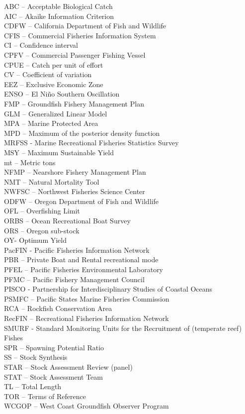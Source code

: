\documentclass[11pt,
  letterpaper,
]{article}
\begin{document}
ABC -- Acceptable Biological Catch\\
AIC -- Akaike Information Criterion\\
CDFW -- California Department of Fish and Wildlife\\
CFIS -- Commercial Fisheries Information System\\
CI -- Confidence interval\\
CPFV -- Commercial Passenger Fishing Vessel\\
CPUE -- Catch per unit of effort\\
CV -- Coefficient of variation\\
EEZ -- Exclusive Economic Zone\\
ENSO -- El Niño Southern Oscillation\\
FMP -- Groundfish Fishery Management Plan\\
GLM -- Generalized Linear Model\\
MPA -- Marine Protected Area\\
MPD -- Maximum of the posterior density function\\
MRFSS - Marine Recreational Fisheries Statistics Survey\\
MSY -- Maximum Sustainable Yield\\
mt -- Metric tons\\
NFMP -- Nearshore Fishery Management Plan\\
NMT -- Natural Mortality Tool\\
NWFSC -- Northwest Fisheries Science Center\\
ODFW -- Oregon Department of Fish and Wildlife\\
OFL -- Overfishing Limit\\
ORBS -- Ocean Recreational Boat Survey\\
ORS -- Oregon sub-stock\\
OY- Optimum Yield\\
PacFIN - Pacific Fisheries Information Network\\
PBR -- Private Boat and Rental recreational mode\\
PFEL -- Pacific Fisheries Environmental Laboratory\\
PFMC -- Pacific Fishery Management Council\\
PISCO - Partnership for Interdisciplinary Studies of Coastal Oceans\\
PSMFC -- Pacific States Marine Fisheries Commission\\
RCA -- Rockfish Conservation Area\\
RecFIN -- Recreational Fisheries Information Network\\
SMURF - Standard Monitoring Units for the Recruitment of (temperate reef) Fishes\\
SPR -- Spawning Potential Ratio\\
SS -- Stock Synthesis\\
STAR -- Stock Assessment Review (panel)\\
STAT -- Stock Assessment Team\\
TL -- Total Length\\
TOR -- Terms of Reference\\
WCGOP -- West Coast Groundfish Observer Program
\end{document}
